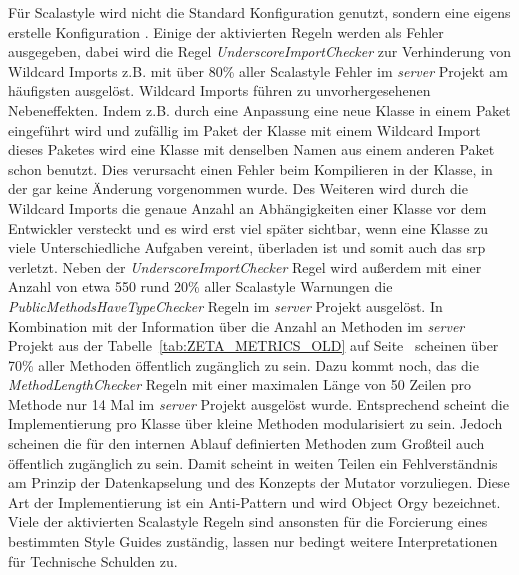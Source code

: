 Für Scalastyle wird nicht die Standard Konfiguration genutzt, sondern eine eigens erstelle Konfiguration \cite{zeta_new_scalastyle}. Einige der aktivierten Regeln werden als Fehler ausgegeben, dabei wird die Regel \textit{UnderscoreImportChecker} zur Verhinderung von Wildcard Imports z.B. mit über 80\% aller Scalastyle Fehler im \textit{server} Projekt am häufigsten ausgelöst. Wildcard Imports führen zu unvorhergesehenen Nebeneffekten. Indem z.B. durch eine Anpassung eine neue Klasse in einem Paket eingeführt wird und zufällig im Paket der Klasse mit einem Wildcard Import dieses Paketes wird eine Klasse mit denselben Namen aus einem anderen Paket schon benutzt. Dies verursacht einen Fehler beim Kompilieren in der Klasse, in der gar keine Änderung vorgenommen wurde. Des Weiteren wird durch die Wildcard Imports die genaue Anzahl an Abhängigkeiten einer Klasse vor dem Entwickler versteckt und es wird erst viel später sichtbar, wenn eine Klasse zu viele Unterschiedliche Aufgaben vereint, überladen ist und somit auch das \ac{srp} verletzt. Neben der \textit{UnderscoreImportChecker} Regel wird außerdem mit einer Anzahl von etwa 550 rund 20\% aller Scalastyle Warnungen die \textit{PublicMethodsHaveTypeChecker} Regeln im \textit{server} Projekt ausgelöst. In Kombination mit der Information über die Anzahl an Methoden im \textit{server} Projekt aus der Tabelle~\ref{tab:ZETA_METRICS_OLD} auf Seite~\pageref{tab:ZETA_METRICS_OLD} scheinen über 70\% aller Methoden öffentlich zugänglich zu sein. Dazu kommt noch, das die \textit{MethodLengthChecker} Regeln mit einer maximalen Länge von 50 Zeilen pro Methode nur 14 Mal im \textit{server} Projekt ausgelöst wurde. Entsprechend scheint die Implementierung pro Klasse über kleine Methoden modularisiert zu sein. Jedoch scheinen die für den internen Ablauf definierten Methoden zum Großteil auch öffentlich zugänglich zu sein. Damit scheint in weiten Teilen ein Fehlverständnis am Prinzip der Datenkapselung und des Konzepts der Mutator vorzuliegen. Diese Art der Implementierung ist ein Anti-Pattern und wird Object Orgy bezeichnet. Viele der aktivierten Scalastyle Regeln sind ansonsten für die Forcierung eines bestimmten Style Guides zuständig, lassen nur bedingt weitere Interpretationen für Technische Schulden zu. 

